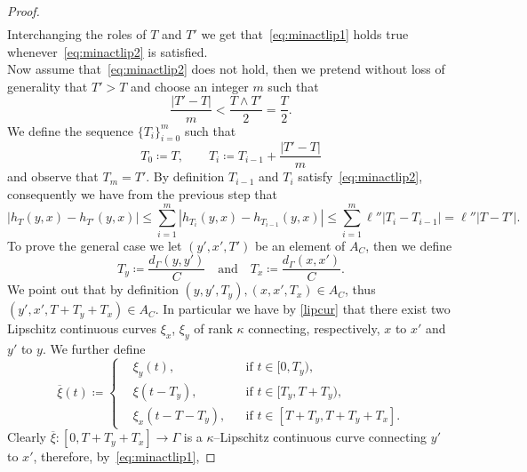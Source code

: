 \documentclass[11pt,a4paper,american]{article}
\newcommand{\ovxi}{\overline\xi}
\begin{document}
\begin{proof}
\begin{align*}
        \end{align*}
        Interchanging the roles of $T$ and $T'$ we get that~\cref{eq:minactlip1} holds true whenever~\cref{eq:minactlip2} is satisfied.\\
        Now assume that~\cref{eq:minactlip2} does not hold, then we pretend without loss of generality that $T'>T$ and choose an integer $m$ such that
        \begin{equation*}
            \frac{|T'-T|}m<\frac{T\wedge T'}2=\frac T2.
        \end{equation*}
        We define the sequence $\{T_i\}_{i=0}^m$ such that
        \begin{equation*}
            T_0\coloneqq T,\qquad T_i\coloneqq T_{i-1}+\frac{|T'-T|}m
        \end{equation*}
        and observe that $T_m=T'$. By definition $T_{i-1}$ and $T_i$ satisfy~\cref{eq:minactlip2}, consequently we have from the previous step that
        \begin{equation*}
            |h_T(y,x)-h_{T'}(y,x)|\le\sum_{i=1}^m\left|h_{T_i}(y,x)-h_{T_{i-1}}(y,x)\right|\le\sum_{i=1}^m\ell''|T_i-T_{i-1}|=\ell''\left|T-T'\right|.
        \end{equation*}
        To prove the general case we let $(y',x',T')$ be an element of $A_C$, then we define
        \begin{equation*}
            T_y\coloneqq\frac{d_\Gamma(y,y')}C\quad\text{and}\quad T_x\coloneqq\frac{d_\Gamma(x,x')}C.
        \end{equation*}
        We point out that by definition $(y,y',T_y),(x,x',T_x)\in A_C$, thus $(y',x',T+T_y+T_x)\in A_C$. In particular we have by \cref{lipcur} that there exist two Lipschitz continuous curves $\xi_x$, $\xi_y$ of rank $\kappa$ connecting, respectively, $x$ to $x'$ and $y'$ to $y$. We further define
        \begin{equation*}
            \ovxi(t)\coloneqq\left\{
            \begin{aligned}
                &\xi_y(t),&&\text{if }t\in[0,T_y),\\
                &\xi(t-T_y),&&\text{if }t\in[T_y,T+T_y),\\
                &\xi_x\left(t-T-T_y\right),&&\text{if }t\in[T+T_y,T+T_y+T_x].
            \end{aligned}
            \right.
        \end{equation*}
        Clearly $\ovxi:[0,T+T_y+T_x]\to\Gamma$ is a $\kappa$--Lipschitz continuous curve connecting $y'$ to $x'$, therefore, by~\cref{eq:minactlip1},

\end{proof}
\end{document}
